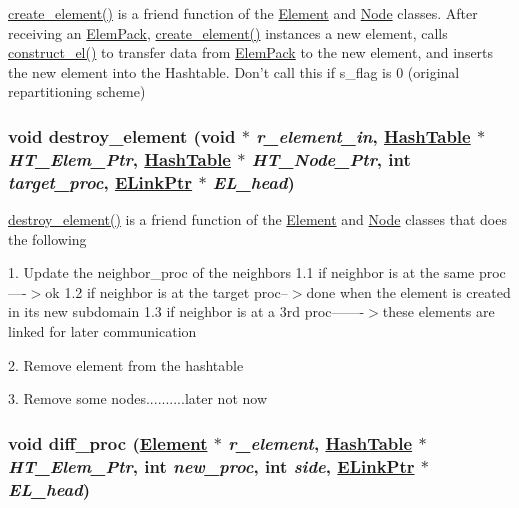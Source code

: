 \hyperlink{BSFC__update__and__send__elements_8C_a0}{create\_\-element()} is a friend function of the \hyperlink{classElement}{Element} and \hyperlink{classNode}{Node} classes. After receiving an \hyperlink{structElemPack}{Elem\-Pack}, \hyperlink{BSFC__update__and__send__elements_8C_a0}{create\_\-element()} instances a new element, calls \hyperlink{update__element__info_8C_a2}{construct\_\-el()} to transfer data from \hyperlink{structElemPack}{Elem\-Pack} to the new element, and inserts the new element into the Hashtable. Don't call this if s\_\-flag is 0 (original repartitioning scheme) 

\hypertarget{update__element__info_8C_a4}{
\subsubsection[destroy\_\-element]{\setlength{\rightskip}{0pt plus 5cm}void destroy\_\-element (void $\ast$ {\em r\_\-element\_\-in}, \hyperlink{classHashTable}{Hash\-Table} $\ast$ {\em HT\_\-Elem\_\-Ptr}, \hyperlink{classHashTable}{Hash\-Table} $\ast$ {\em HT\_\-Node\_\-Ptr}, int {\em target\_\-proc}, \hyperlink{structElementLink}{ELink\-Ptr} $\ast$ {\em EL\_\-head})}}
\label{update__element__info_8C_a4}


\hyperlink{update__element__info_8C_a4}{destroy\_\-element()} is a friend function of the \hyperlink{classElement}{Element} and \hyperlink{classNode}{Node} classes that does the following

1. Update the neighbor\_\-proc of the neighbors 1.1 if neighbor is at the same proc----$>$ok 1.2 if neighbor is at the target proc--$>$done when the element is created in its new subdomain 1.3 if neighbor is at a 3rd proc-------$>$these elements are linked for later communication

2. Remove element from the hashtable

3. Remove some nodes..........later not now \hypertarget{update__element__info_8C_a1}{
\subsubsection[diff\_\-proc]{\setlength{\rightskip}{0pt plus 5cm}void diff\_\-proc (\hyperlink{classElement}{Element} $\ast$ {\em r\_\-element}, \hyperlink{classHashTable}{Hash\-Table} $\ast$ {\em HT\_\-Elem\_\-Ptr}, int {\em new\_\-proc}, int {\em side}, \hyperlink{structElementLink}{ELink\-Ptr} $\ast$ {\em EL\_\-head})}}
\label{update__element__info_8C_a1}


